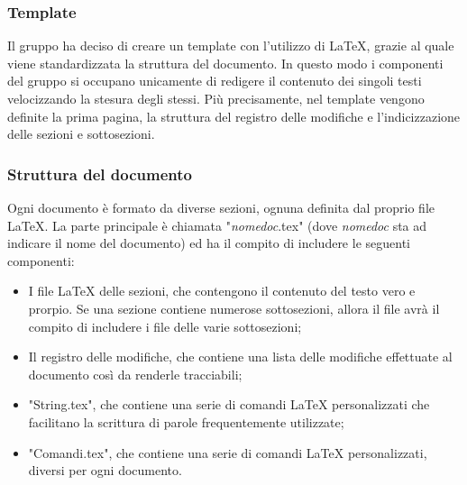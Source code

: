 \subsubsection{Template}
Il gruppo ha deciso di creare un template con l'utilizzo di \LaTeX{}, grazie al quale viene standardizzata la struttura del documento. In questo modo i componenti del gruppo si occupano unicamente di redigere il contenuto dei singoli testi velocizzando la stesura degli stessi. Più precisamente, nel template vengono definite la prima pagina, la struttura del registro delle modifiche e l'indicizzazione delle sezioni e sottosezioni.

\subsubsection{Struttura del documento}
Ogni documento è formato da diverse sezioni, ognuna definita dal proprio file \LaTeX. La parte principale è chiamata "\textit{nomedoc}.tex" (dove \textit{nomedoc} sta ad indicare il nome del documento) ed ha il compito di includere le seguenti componenti:
\begin{itemize}
	\item I file \LaTeX{} delle sezioni, che contengono il contenuto del testo vero e prorpio. Se una sezione contiene numerose sottosezioni, allora il file avrà il compito di includere i file delle varie sottosezioni;
	
	\item Il registro delle modifiche, che contiene una lista delle modifiche effettuate al documento così da renderle tracciabili;
	
	\item "String.tex", che contiene una serie di comandi \LaTeX{} personalizzati che facilitano la scrittura di parole frequentemente utilizzate;
	
	\item "Comandi.tex", che contiene una serie di comandi \LaTeX{} personalizzati, diversi per ogni documento.
\end{itemize}

